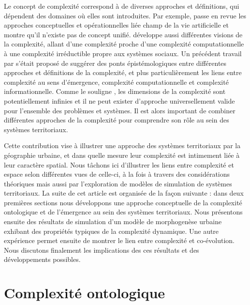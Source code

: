 \documentclass[11pt]{article}
\begin{document}
Le concept de complexité correspond à de diverses approches et définitions, qui dépendent des domaines où elles sont introduites. Par exemple, \cite{chu2008criteria} passe en revue les approches conceptuelles et opérationnelles liée champ de la vie artificielle et montre qu'il n'existe pas de concept unifié. \cite{deffuant2015visions} développe aussi différentes visions de la complexité, allant d'une complexité proche d'une complexité computationnelle à une complexité irréductible propre aux systèmes sociaux. Un précédent travail par \cite{raimbault2018relating} s'était proposé de suggérer des ponts épistémologiques entre différentes approches et définitions de la complexité, et plus particulièrement les liens entre complexité au sens d'émergence, complexité computationnelle et complexité informationnelle. Comme le souligne \cite{batty2018defining}, les dimensions de la complexité sont potentiellement infinies et il ne peut exister d'approche universellement valide pour l'ensemble des problèmes et systèmes. Il est alors important de combiner différentes approches de la complexité pour comprendre son rôle au sein des systèmes territoriaux. 

Cette contribution vise à illustrer une approche des systèmes territoriaux par la géographie urbaine, et dans quelle mesure leur complexité est intimement liée à leur caractère spatial. Nous tâchons ici d'illustrer les liens entre complexité et espace selon différentes vues de celle-ci, à la fois à travers des considérations théoriques mais aussi par l'exploration de modèles de simulation de systèmes territoriaux. La suite de cet article est organisée de la façon suivante : dans deux premières sections nous développons une approche conceptuelle de la complexité ontologique et de l'émergence au sein des systèmes territoriaux. Nous présentons ensuite des résultats de simulation d'un modèle de morphogenèse urbaine exhibant des propriétés typiques de la complexité dynamique. Une autre expérience permet ensuite de montrer le lien entre complexité et co-évolution. Nous discutons finalement les implications des ces résultats et des développements possibles.



\section{Complexité ontologique}


\end{document}
